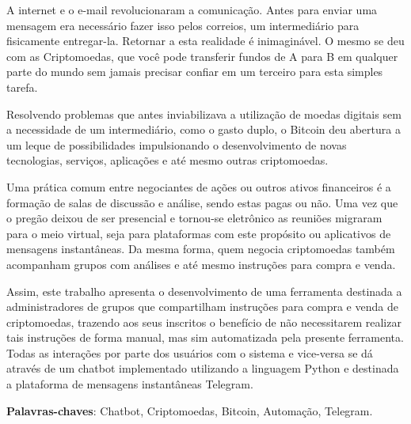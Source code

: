 \begin{resumo}

A internet e o e-mail revolucionaram a comunicação. Antes para enviar uma mensagem era necessário fazer isso pelos correios, um intermediário para fisicamente entregar-la. Retornar a esta realidade é inimaginável. O mesmo se deu com as Criptomoedas, que você pode transferir fundos de A para B em qualquer parte do mundo sem jamais precisar confiar em um terceiro para esta simples tarefa. 

Resolvendo problemas que antes inviabilizava a utilização de moedas digitais sem a necessidade de um intermediário, como o gasto duplo, o Bitcoin deu abertura a um leque de possibilidades impulsionando o desenvolvimento de novas tecnologias, serviços, aplicações e até mesmo outras criptomoedas. 

Uma prática comum entre negociantes de ações ou outros ativos financeiros é a formação de salas de  discussão e análise, sendo estas pagas ou não. Uma vez que o pregão deixou de ser presencial e tornou-se eletrônico as reuniões migraram para o meio virtual, seja para plataformas com este propósito ou aplicativos de mensagens instantâneas. Da mesma forma, quem negocia criptomoedas também acompanham grupos com análises e até mesmo instruções para compra e venda. 

Assim, este trabalho apresenta o desenvolvimento de uma ferramenta destinada a administradores de grupos que compartilham instruções para compra e venda de criptomoedas, trazendo aos seus inscritos o benefício de não necessitarem realizar tais instruções de forma manual, mas sim automatizada pela presente ferramenta. Todas as interações por parte dos usuários com o sistema e vice-versa se dá através de um chatbot implementado utilizando a linguagem Python e destinada a plataforma de mensagens instantâneas Telegram.

\vspace{\onelineskip}
\noindent
\textbf{Palavras-chaves}: Chatbot, Criptomoedas, Bitcoin, Automação, Telegram.
\end{resumo}